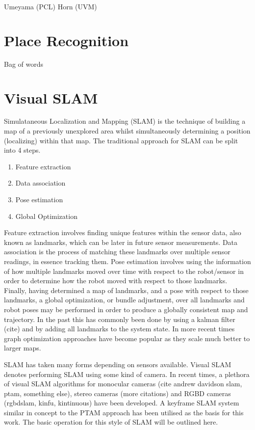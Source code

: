 Umeyama (PCL) \newline 
Horn (UVM)


\section{Place Recognition}

Bag of words

\section{Visual SLAM}


Simulataneous Localization and Mapping (SLAM) is the technique of building a map of a previously
unexplored area whilst simultaneously determining a position (localizing) within that map.  The
traditional approach for SLAM can be split into 4 steps.
\begin{enumerate} \itemsep1pt \parskip0pt 
 \item Feature extraction
 \item Data association
 \item Pose estimation
 \item Global Optimization
\end{enumerate}

Feature extraction involves finding unique features within the sensor data, also known as
landmarks, which can be later in future sensor measurements.  Data association is the process of
matching these landmarks over multiple sensor readings, in essence tracking them.  Pose estimation
involves using the information of how multiple landmarks moved over time with respect to the
robot/sensor in order to determine how the robot moved with respect to those landmarks.  Finally,
having determined a map of landmarks, and a pose with respect to those landmarks, a global
optimization, or bundle adjustment, over all landmarks and robot poses may be performed in order to
produce a globally consistent map and trajectory.  In the past this has commonly been done by using
a kalman filter (cite) and by adding all landmarks to the system state.  In more recent times graph
optimization approaches have become popular as they scale much better to larger maps.

SLAM has taken many forms depending on sensors available. Visual SLAM denotes performing SLAM using
some kind of camera.  In recent times, a plethora of visual SLAM algorithms for monocular cameras
(cite andrew davidson slam, ptam, something else), stereo cameras (more citations) and RGBD cameras
(rgbdslam, kinfu, kintinuous) have been developed.  A keyframe SLAM system similar in concept to the
PTAM approach has been utilised as the basis for this work.  The basic operation for this style of
SLAM will be outlined here.

